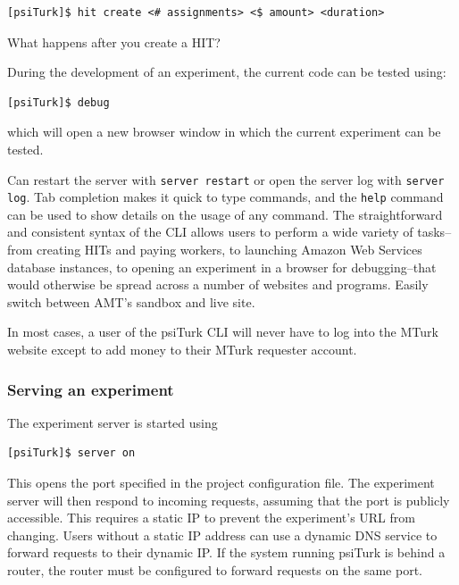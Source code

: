 \documentclass[twocolumn]{svjour3}          %
\begin{document}
\begin{lstlisting}
[psiTurk]$ hit create <# assignments> <$ amount> <duration>
\end{lstlisting}

What happens after you create a HIT?

%

During the development of an experiment, the current code can be tested using:

\begin{lstlisting}
[psiTurk]$ debug
\end{lstlisting}

\noindent which will open a new browser window in which the current experiment can be tested.

Can restart the server with \texttt{server restart} or open the server log with \texttt{server log}. 
Tab completion makes it quick to type commands, and the \texttt{help} command can be used to show
details on the usage of any command. 
The straightforward and consistent syntax of the CLI allows
users to perform a wide variety of tasks--from creating HITs and paying workers, to launching Amazon
Web Services database instances, to opening an experiment in a browser for debugging--that
would otherwise be spread across a number of websites and programs. 
Easily switch between AMT's sandbox and live site.

In most cases, a user of the
psiTurk CLI will never have to log into the MTurk website except to add money to their MTurk
requester account.



\subsubsection{Serving an experiment}

The experiment server is started using

\begin{lstlisting}
[psiTurk]$ server on
\end{lstlisting}

\noindent This opens the port specified in the project configuration file.
The experiment server will then respond to incoming requests, assuming that the port is publicly accessible.
This requires a static IP to prevent the experiment's URL from changing.
Users without a static IP address can use a dynamic DNS service to forward requests to their dynamic IP.
If the system running psiTurk is behind a router, the router must be configured to forward requests on the same port.
\end{document}
